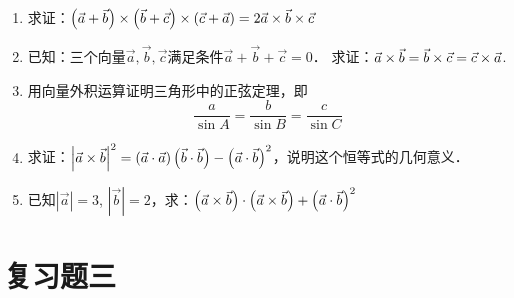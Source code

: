 \begin{enumerate}
\item 求证：$\left(\vec{a}+\vec{b}\right)\times\left(\vec{b}+\vec{c}\right)\times \left(\vec{c}+\vec{a}\right)=2\vec{a}\times \vec{b}\times \vec{c}$
\item 已知：三个向量$\vec{a},\vec{b},\vec{c}$满足条件$\vec{a}+\vec{b}+\vec{c}=0$．
求证：$\vec{a}\times\vec{b}=\vec{b}\times\vec{c}=\vec{c}\times\vec{a}$.
\item 用向量外积运算证明三角形中的正弦定理，即
\[\frac{a}{\sin A}=\frac{b}{\sin B}=\frac{c}{\sin C}\]

\item 求证：$\left|\vec{a}\times \vec{b}\right|^2=\left(\vec{a}\cdot \vec{a}\right)\left(\vec{b}\cdot \vec{b}\right)-\left(\vec{a}\cdot \vec{b}\right)^2$，说明这个恒等式的几何意义．

\item 已知$|\vec{a}|=3$, $|\vec{b}|=2$，求：$\left(\vec{a}\times\vec{b}\right)\cdot \left(\vec{a}\times\vec{b}\right)+\left(\vec{a}\cdot \vec{b}\right)^2$
\end{enumerate}

\section*{复习题三}

